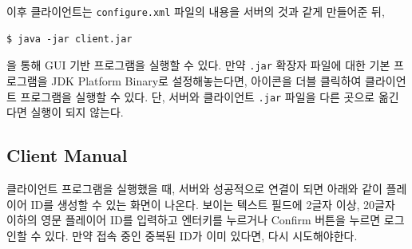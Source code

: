 \documentclass[a4paper, 10pt]{article}
\begin{document}
이후 클라이언트는 \texttt{configure.xml} 파일의 내용을 서버의 것과
같게 만들어준 뒤,
\begin{Verbatim}[tabsize=4,xleftmargin=2em]
$ java -jar client.jar
\end{Verbatim}
을 통해 GUI 기반 프로그램을 실행할 수 있다. 만약 \texttt{.jar} 확장자
파일에 대한 기본 프로그램을 JDK Platform Binary로 설정해놓는다면,
아이콘을 더블 클릭하여 클라이언트 프로그램을 실행할 수 있다. 단, 서버와
클라이언트 \texttt{.jar} 파일을 다른 곳으로 옮긴다면 실행이 되지 않는다.

\subsection{Client Manual}
클라이언트 프로그램을 실행했을 때, 서버와 성공적으로 연결이 되면 아래와 같이
플레이어 ID를 생성할 수 있는 화면이 나온다.
보이는 텍스트 필드에 2글자 이상, 20글자 이하의 영문 플레이어 ID를 입력하고
엔터키를 누르거나 Confirm 버튼을 누르면 로그인할 수 있다. 만약 접속 중인
중복된 ID가 이미 있다면, 다시 시도해야한다.
\end{document}
